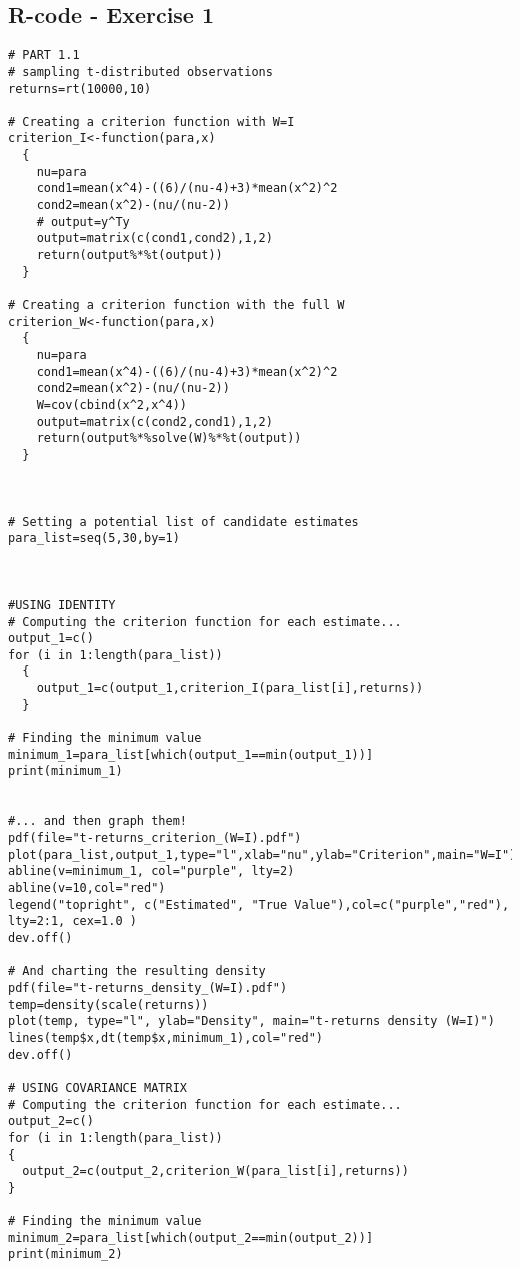 \begin{appendices}

\chapter{R-code - Exercise 1}

\begin{verbatim}
# PART 1.1
# sampling t-distributed observations
returns=rt(10000,10)

# Creating a criterion function with W=I
criterion_I<-function(para,x)
  {
    nu=para
    cond1=mean(x^4)-((6)/(nu-4)+3)*mean(x^2)^2
    cond2=mean(x^2)-(nu/(nu-2))
    # output=y^Ty
    output=matrix(c(cond1,cond2),1,2)
    return(output%*%t(output))
  }

# Creating a criterion function with the full W
criterion_W<-function(para,x)
  {
    nu=para
    cond1=mean(x^4)-((6)/(nu-4)+3)*mean(x^2)^2
    cond2=mean(x^2)-(nu/(nu-2))
    W=cov(cbind(x^2,x^4))
    output=matrix(c(cond2,cond1),1,2)
    return(output%*%solve(W)%*%t(output))
  }



# Setting a potential list of candidate estimates
para_list=seq(5,30,by=1)



#USING IDENTITY
# Computing the criterion function for each estimate...
output_1=c()
for (i in 1:length(para_list))
  {
    output_1=c(output_1,criterion_I(para_list[i],returns))
  }

# Finding the minimum value
minimum_1=para_list[which(output_1==min(output_1))]
print(minimum_1)


#... and then graph them!
pdf(file="t-returns_criterion_(W=I).pdf")
plot(para_list,output_1,type="l",xlab="nu",ylab="Criterion",main="W=I")
abline(v=minimum_1, col="purple", lty=2)
abline(v=10,col="red")
legend("topright", c("Estimated", "True Value"),col=c("purple","red"), lty=2:1, cex=1.0 )
dev.off()

# And charting the resulting density
pdf(file="t-returns_density_(W=I).pdf")
temp=density(scale(returns))
plot(temp, type="l", ylab="Density", main="t-returns density (W=I)")
lines(temp$x,dt(temp$x,minimum_1),col="red")
dev.off()

# USING COVARIANCE MATRIX
# Computing the criterion function for each estimate...
output_2=c()
for (i in 1:length(para_list))
{
  output_2=c(output_2,criterion_W(para_list[i],returns))
}

# Finding the minimum value
minimum_2=para_list[which(output_2==min(output_2))]
print(minimum_2)



\end{verbatim}
\end{appendices}
